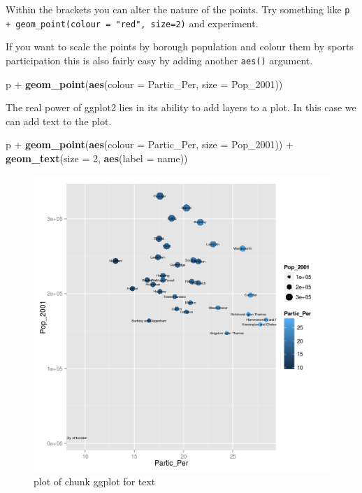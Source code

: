 \documentclass[]{article}
\makeatletter
\newenvironment{Shaded}{}{}
\newcommand{\KeywordTok}[1]{\textcolor[rgb]{0.00,0.44,0.13}{\textbf{{#1}}}}
\newcommand{\DataTypeTok}[1]{\textcolor[rgb]{0.56,0.13,0.00}{{#1}}}
\newcommand{\DecValTok}[1]{\textcolor[rgb]{0.25,0.63,0.44}{{#1}}}
\newcommand{\NormalTok}[1]{{#1}}
\def\maxwidth{\ifdim\Gin@nat@width>\linewidth\linewidth
\else\Gin@nat@width\fi}
\let\Oldincludegraphics\includegraphics
\renewcommand{\includegraphics}[1]{\Oldincludegraphics[width=\maxwidth]{#1}}
\makeatother
\begin{document}
Within the brackets you can alter the nature of the points. Try
something like \texttt{p + geom\_point(colour = "red", size=2)} and
experiment.

If you want to scale the points by borough population and colour them by
sports participation this is also fairly easy by adding another
\texttt{aes()} argument.

\begin{Shaded}
\begin{Highlighting}[]
\NormalTok{p + }\KeywordTok{geom_point}\NormalTok{(}\KeywordTok{aes}\NormalTok{(}\DataTypeTok{colour =} \NormalTok{Partic_Per, }\DataTypeTok{size =} \NormalTok{Pop_2001))}
\end{Highlighting}
\end{Shaded}
The real power of ggplot2 lies in its ability to add layers to a plot.
In this case we can add text to the plot.

\begin{Shaded}
\begin{Highlighting}[]
\NormalTok{p + }\KeywordTok{geom_point}\NormalTok{(}\KeywordTok{aes}\NormalTok{(}\DataTypeTok{colour =} \NormalTok{Partic_Per, }\DataTypeTok{size =} \NormalTok{Pop_2001)) + }\KeywordTok{geom_text}\NormalTok{(}\DataTypeTok{size =} \DecValTok{2}\NormalTok{, }
    \KeywordTok{aes}\NormalTok{(}\DataTypeTok{label =} \NormalTok{name))}
\end{Highlighting}
\end{Shaded}
\begin{figure}[htbp]
\centering
\includegraphics{figure/ggplot_for_text.png}
\caption{plot of chunk ggplot for text}
\end{figure}
\end{document}
